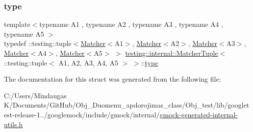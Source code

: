 \subsubsection{\texorpdfstring{type}{type}}
{\footnotesize\ttfamily template$<$typename A1 , typename A2 , typename A3 , typename A4 , typename A5 $>$ \\
typedef \+::testing\+::tuple$<$\mbox{\hyperlink{classtesting_1_1_matcher}{Matcher}}$<$A1$>$, \mbox{\hyperlink{classtesting_1_1_matcher}{Matcher}}$<$A2$>$, \mbox{\hyperlink{classtesting_1_1_matcher}{Matcher}}$<$A3$>$, \mbox{\hyperlink{classtesting_1_1_matcher}{Matcher}}$<$A4$>$, \mbox{\hyperlink{classtesting_1_1_matcher}{Matcher}}$<$A5$>$ $>$ \mbox{\hyperlink{structtesting_1_1internal_1_1_matcher_tuple}{testing\+::internal\+::\+Matcher\+Tuple}}$<$ \+::testing\+::tuple$<$ A1, A2, A3, A4, A5 $>$ $>$\+::\mbox{\hyperlink{structtesting_1_1internal_1_1_matcher_tuple_3_01_1_1testing_1_1tuple_3_01_a1_00_01_a2_00_01_a3_00_01_a4_00_01_a5_01_4_01_4_a3c6f888e9aee4d15d4b5821eeff658d4}{type}}}



The documentation for this struct was generated from the following file\+:\begin{DoxyCompactItemize}
\item 
C\+:/\+Users/\+Mindaugas K/\+Documents/\+Git\+Hub/\+Obj\+\_\+\+Duomenu\+\_\+apdorojimas\+\_\+class/\+Obj\+\_\+test/lib/googletest-\/release-\/1../googlemock/include/gmock/internal/\mbox{\hyperlink{gmock-generated-internal-utils_8h}{gmock-\/generated-\/internal-\/utils.\+h}}\end{DoxyCompactItemize}
